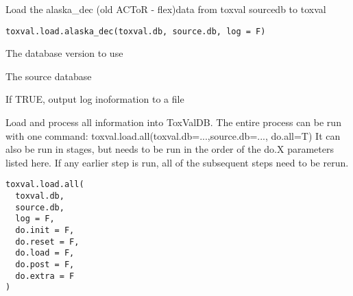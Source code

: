 \documentclass[letterpaper]{book}
\begin{document}
%
\begin{Description}\relax
Load the alaska\_dec (old ACToR - flex)data  from toxval sourcedb to toxval
\end{Description}
%
\begin{Usage}
\begin{verbatim}
toxval.load.alaska_dec(toxval.db, source.db, log = F)
\end{verbatim}
\end{Usage}
%
\begin{Arguments}
\begin{ldescription}
\item[\code{toxval.db}] The database version to use

\item[\code{source.db}] The source database

\item[\code{log}] If TRUE, output log inoformation to a file
\end{ldescription}
\end{Arguments}
%
\begin{Description}\relax
Load and process all information into ToxValDB. The entire process can be run with
one command: toxval.load.all(toxval.db=...,source.db=..., do.all=T)
It can also be run in stages, but needs to be run in the order of the do.X parameters
listed here. If any earlier step is run, all of the subsequent steps need to be rerun.
\end{Description}
%
\begin{Usage}
\begin{verbatim}
toxval.load.all(
  toxval.db,
  source.db,
  log = F,
  do.init = F,
  do.reset = F,
  do.load = F,
  do.post = F,
  do.extra = F
)
\end{verbatim}
\end{Usage}
%
\end{document}
